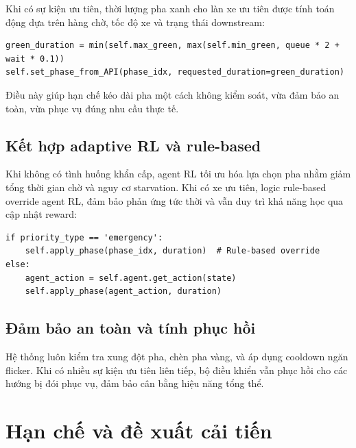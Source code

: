 Khi có sự kiện ưu tiên, thời lượng pha xanh cho làn xe ưu tiên được tính toán động dựa trên hàng chờ, tốc độ xe và trạng thái downstream:

\begin{lstlisting}[style=py,caption={Tối ưu hóa thời lượng pha cho xe ưu tiên}]
green_duration = min(self.max_green, max(self.min_green, queue * 2 + wait * 0.1))
self.set_phase_from_API(phase_idx, requested_duration=green_duration)
\end{lstlisting}

Điều này giúp hạn chế kéo dài pha một cách không kiểm soát, vừa đảm bảo an toàn, vừa phục vụ đúng nhu cầu thực tế.

\subsection{Kết hợp adaptive RL và rule-based}

Khi không có tình huống khẩn cấp, agent RL tối ưu hóa lựa chọn pha nhằm giảm tổng thời gian chờ và nguy cơ starvation. Khi có xe ưu tiên, logic rule-based override agent RL, đảm bảo phản ứng tức thời và vẫn duy trì khả năng học qua cập nhật reward:

\begin{lstlisting}[style=py,caption={Override RL agent khi xuất hiện xe ưu tiên}]
if priority_type == 'emergency':
    self.apply_phase(phase_idx, duration)  # Rule-based override
else:
    agent_action = self.agent.get_action(state)
    self.apply_phase(agent_action, duration)
\end{lstlisting}

\subsection{Đảm bảo an toàn và tính phục hồi}

Hệ thống luôn kiểm tra xung đột pha, chèn pha vàng, và áp dụng cooldown ngăn flicker. Khi có nhiều sự kiện ưu tiên liên tiếp, bộ điều khiển vẫn phục hồi cho các hướng bị đói phục vụ, đảm bảo cân bằng hiệu năng tổng thể.

\section{Hạn chế và đề xuất cải tiến}

